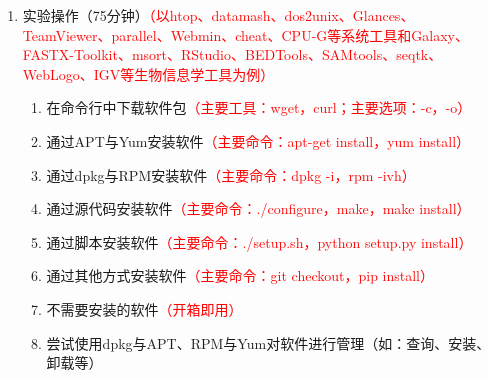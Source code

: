 \documentclass{TIJMUjiaoanSY}
\begin{document}
\begin{enumerate}
\otherTail
\newpage
\otherHeader

  \item
    实验操作（75分钟）\textcolor{red}{（以htop、datamash、dos2unix、Glances、TeamViewer、parallel、Webmin、cheat、CPU-G等系统工具和Galaxy、FASTX-Toolkit、msort、RStudio、BEDTools、SAMtools、seqtk、WebLogo、IGV等生物信息学工具为例）}
    \begin{enumerate}
      \item 在命令行中下载软件包\textcolor{red}{（主要工具：wget，curl；主要选项：-c，-o）}
      \item 通过APT与Yum安装软件\textcolor{red}{（主要命令：apt-get install，yum install）}
      \item 通过dpkg与RPM安装软件\textcolor{red}{（主要命令：dpkg -i，rpm -ivh）}
      \item 通过源代码安装软件\textcolor{red}{（主要命令：./configure，make，make install）}
      \item 通过脚本安装软件\textcolor{red}{（主要命令：./setup.sh，python setup.py install）}
      \item 通过其他方式安装软件\textcolor{red}{（主要命令：git checkout，pip install）}
      \item 不需要安装的软件\textcolor{red}{（开箱即用）}
      \item 尝试使用dpkg与APT、RPM与Yum对软件进行管理（如：查询、安装、卸载等）
    \end{enumerate}
\end{enumerate}


\otherTail
\end{document}
